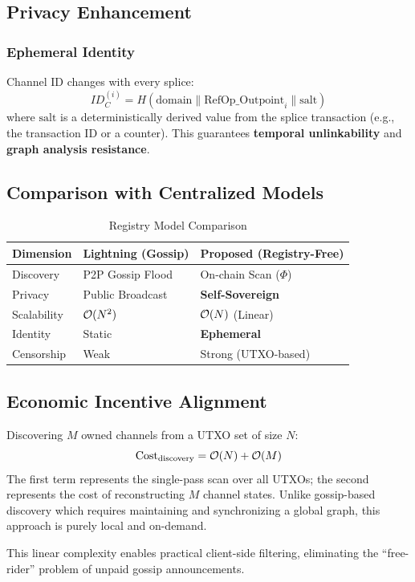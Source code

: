 \subsection{Privacy Enhancement}
\subsubsection{Ephemeral Identity}
Channel ID changes with every splice:
$$ ID_C^{(i)} = H(\text{domain} \parallel \text{RefOp\_Outpoint}_i \parallel \text{salt}) $$
where $\text{salt}$ is a deterministically derived value from the splice transaction (e.g., the transaction ID or a counter). This guarantees \textbf{temporal unlinkability} and \textbf{graph analysis resistance}.

\subsection{Comparison with Centralized Models}

\begin{table}[htbp]
\centering
\caption{Registry Model Comparison}
\label{tab:registry_comparison}
\small
\begin{tabularx}{\linewidth}{@{}lXX@{}}
\toprule
\textbf{Dimension} & \textbf{Lightning (Gossip)} & \textbf{Proposed (Registry-Free)} \\
\midrule
Discovery & P2P Gossip Flood & On-chain Scan ($\Phi$) \\
Privacy & Public Broadcast & \textbf{Self-Sovereign} \\
Scalability & $\mathcal{O}(N^2)$ & $\mathcal{O}(N)$ (Linear) \\
Identity & Static & \textbf{Ephemeral} \\
Censorship & Weak & Strong (UTXO-based) \\
\bottomrule
\end{tabularx}
\end{table}

\subsection{Economic Incentive Alignment}

\begin{theorem}
Discovering $M$ owned channels from a UTXO set of size $N$:
$$ \mathrm{Cost}_{\mathrm{discovery}} = \mathcal{O}(N) + \mathcal{O}(M) $$
The first term represents the single-pass scan over all UTXOs; the second represents the cost of reconstructing $M$ channel states. Unlike gossip-based discovery which requires maintaining and synchronizing a global graph, this approach is purely local and on-demand.
\end{theorem}
This linear complexity enables practical client-side filtering, eliminating the ``free-rider'' problem of unpaid gossip announcements.

